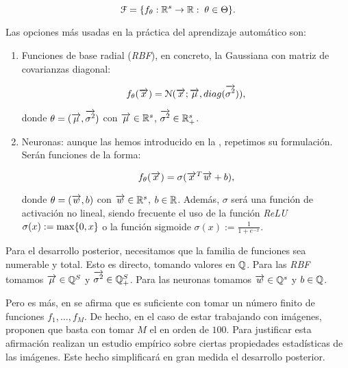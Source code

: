 \begin{equation}
	\mathcal{F} = \{  f_{\theta}: \mathbb{R}^s \to \mathbb{R}: \; \theta \in \Theta \}.
\end{equation}

Las opciones más usadas en la práctica del aprendizaje automático son:

\begin{enumerate}
    \item Funciones de base radial (\textit{RBF}), en concreto, la Gaussiana con matriz de covarianzas diagonal:

	      \begin{equation}
		      f_\theta(\overrightarrow{x}) = \mathcal{N}(\overrightarrow{x}; \overrightarrow{\mu}, diag(\overrightarrow{\sigma^2})),
	      \end{equation}

          donde $\theta = (\overrightarrow{\mu}, \overrightarrow{\sigma^2})$ con $\overrightarrow{\mu} \in \mathbb{R}^s$, $\overrightarrow{\sigma^2} \in \mathbb{R}^s_+$.

      \item Neuronas: aunque las hemos introducido en la  , repetimos su formulación. Serán funciones de la forma:

        \begin{equation}
            f_\theta(\overrightarrow{x}) = \sigma(\overrightarrow{x}^T \overrightarrow{w} + b),
        \end{equation}

        donde $\theta = (\overrightarrow{w}, b)$ con $\overrightarrow{w} \in \mathbb{R}^s$, $b \in \mathbb{R}$. Además, $\sigma$ será una función de activación no lineal, siendo frecuente el uso de la función \textit{ReLU} $\sigma(x) := \max \{ 0, x \}$ o la función sigmoide $\sigma(x) := \frac{1}{1 + e^{-x}}$.
\end{enumerate}

Para el desarrollo posterior, necesitamos que la familia de funciones sea numerable y total. Esto es directo, tomando valores en $ \mathbb{Q}$. Para las \textit{RBF} tomamos $\overrightarrow{\mu} \in \mathbb{Q}^S$ y $\overrightarrow{\sigma^2} \in \mathbb{Q}^S_+$. Para las neuronas tomamos $\overrightarrow{w} \in \mathbb{Q}^s$ y $b \in \mathbb{Q}$.

Pero es más, en \cite{matematicas:principal} se afirma que es suficiente con tomar un número finito de funciones ${f_1, \ldots, f_M}$. De hecho, en el caso de estar trabajando con imágenes, proponen que basta con tomar $M$ el en orden de $100$. Para justificar esta afirmación realizan un estudio empírico sobre ciertas propiedades estadísticas de las imágenes. Este hecho simplificará en gran medida el desarrollo posterior.
